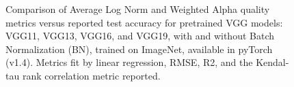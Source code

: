 \begin{figure}[t]
    \centering
    \qquad
    \qquad
    \qquad
    \caption{Comparison of Average Log Norm and Weighted Alpha quality metrics versus reported test accuracy for pretrained VGG models: 
             VGG11, VGG13, VGG16, and VGG19, with and without Batch Normalization (BN),
             trained on ImageNet, available in pyTorch (v1.4).  
             Metrics fit by linear regression, RMSE, R2, and the Kendal-tau rank correlation metric reported.  }
    \label{fig:vgg-metrics}
\end{figure}


